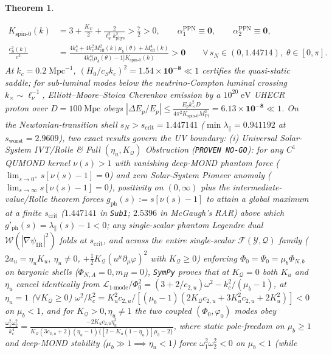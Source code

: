 \documentclass[11pt,a4paper]{article}
\newtheorem{theorem}{Theorem}
\begin{document}
\begin{theorem}
\begin{enumerate}
  \begin{equation}
  \begin{aligned}
    K_{\mathrm{spin\text{-}0}}(k) &= 3 + \frac{K_\psi}{2} + \frac{2}{\ell_u^2 k_{\mathrm{phys}}^2} > \frac{7}{2} > 0, \qquad \alpha_1^{\mathrm{PPN}} \equiv \mathbf{0}, \qquad \alpha_2^{\mathrm{PPN}} \equiv \mathbf{0}, \\
    \frac{c_S^2(k)}{c^2} &= \frac{4k_c^4 + 4k_c^2 M_{\mathrm{eff}}^2(k)\mu_b(\theta) + M_{\mathrm{eff}}^4(k)}{4k_c^4\bigl[\mu_b(\theta) - 1\bigr]K_{\mathrm{spin\text{-}0}}(k)} > \mathbf{0} \qquad \forall\,s_N \in (0, 1.44714),\; \theta \in [0,\pi].
  \end{aligned}
  \label{eq:luminal-ppn}
  \end{equation}
  At $k_c = 0.2\;\mathrm{Mpc}^{-1}$, $(H_0/c_S k_c)^2 = \mathbf{1.54\times 10^{-8}} \ll 1$ certifies the quasi-static saddle; for sub-luminal modes below the neutrino-Compton luminal crossing $k_\times \sim \ell_\nu^{-1}$, Elliott--Moore--Stoica Cherenkov emission \cite{ElliottMooreStoica2005} by a $10^{20}\;\mathrm{eV}$ UHECR proton over $D = 100\;\mathrm{Mpc}$ obeys $|\Delta E_p/E_p| \le \frac{E_p k_\times^2 D}{4\pi^2 K_{\mathrm{spin\text{-}0}}M_{\mathrm{Pl}}^2} = \mathbf{6.13\times 10^{-8}} \ll 1$. On the Newtonian-transition shell $s_N > s_{\mathrm{crit}} = 1.447141$ ($\min\lambda_\parallel = 0.941192$ at $s_{\mathrm{worst}} = 2.9609$), two exact results govern the UV boundary: (i) \emph{Universal Solar-System IVT/Rolle \& Full $(\eta_u, K_{\mathcal{Q}})$ Obstruction ({\upshape\texttt{PROVEN NO-GO}}):} for \emph{any} $C^1$ QUMOND kernel $\nu(s) > 1$ with vanishing deep-MOND phantom force ($\lim_{s\to 0^+}s[\nu(s)-1] = 0$) and zero Solar-System Pioneer anomaly ($\lim_{s\to\infty}s[\nu(s)-1] = 0$), positivity on $(0,\infty)$ plus the intermediate-value/Rolle theorem forces $g_{\mathrm{ph}}(s) := s[\nu(s)-1]$ to attain a global maximum at a finite $s_{\mathrm{crit}}$ ($1.447141$ in {\upshape\texttt{Sub1}}; $2.5396$ in McGaugh's RAR) above which $g'_{\mathrm{ph}}(s) = \lambda_\parallel(s) - 1 < 0$; any single-scalar phantom Legendre dual $\mathcal{W}(|\nabla\psi_{\mathrm{IR}}|^2)$ folds at $s_{\mathrm{crit}}$, and across the \emph{entire} single-scalar $\mathcal{F}(\mathcal{Y},\mathcal{Q})$ family ($2a_u = \eta_u K_u$, $\eta_u \neq 0$, $+\frac{1}{2}K_{\mathcal{Q}}(u^\mu\partial_\mu\varphi)^2$ with $K_{\mathcal{Q}} \ge 0$) enforcing $\Phi_0 = \Psi_0 = \mu_b\Phi_{N,b}$ on baryonic shells ($\Phi_{N,A} = 0, m_H = 0$), \texttt{SymPy} proves that at $K_{\mathcal{Q}} = 0$ both $K_u$ and $\eta_u$ cancel identically from $\mathcal{L}_{\mathrm{1\text{-}mode}}/\Phi_0^2 = (3 + 2/c_{2,u})\omega^2 - k_c^2/(\mu_b - 1)$, at $\eta_u = 1$ ($\forall K_{\mathcal{Q}} \ge 0$) $\omega^2/k_c^2 = K_u^2 c_{2,u}/\allowbreak[(\mu_b - 1)(2K_{\mathcal{Q}}c_{2,u} + 3K_u^2 c_{2,u} + 2K_u^2)] < 0$ on $\mu_b < 1$, and for $K_{\mathcal{Q}} > 0, \eta_u \neq 1$ the two coupled $(\Phi_0,\varphi_0)$ modes obey $\frac{\omega_1^2\omega_2^2}{k_c^4} = \frac{-2K_u c_{2,u}\eta_u^2}{K_{\mathcal{Q}}(3c_{2,u}+2)(\eta_u-1)\{[2 - K_u(1-\eta_u)]\mu_b - 2\}}$, where static pole-freedom on $\mu_b \ge 1$ and deep-MOND stability ($\mu_b \gg 1 \implies \eta_u < 1$) force $\omega_1^2\omega_2^2 < 0$ on $\mu_b < 1$ (while 
\end{enumerate}
\end{theorem}
\end{document}
